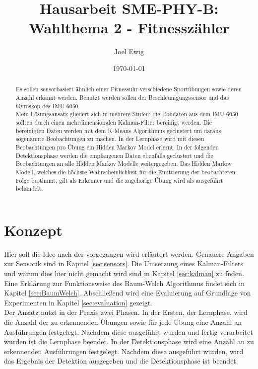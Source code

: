 \documentclass{article}
\begin{document}
\title{Hausarbeit SME-PHY-B: Wahlthema 2 - Fitnesszähler}
\author{Joel Ewig}
\date{\today}
\maketitle
\clearpage

\begin{abstract}
Es sollen sensorbasiert ähnlich einer Fitnessuhr verschiedene Sportübungen sowie deren Anzahl erkannt werden.
Benutzt werden sollen der Beschleunigungssensor und das Gyroskop des IMU-6050.\\
Mein Lösungsansatz gliedert sich in mehrere Stufen:
die Rohdaten aus dem IMU-6050 sollten durch einen mehrdimensionalen Kalman-Filter bereinigt werden.
Die bereinigten Daten werden mit dem K-Means Algorithmus geclustert um daraus sogenannte \glqq{}Beobachtungen\grqq{} zu machen. %
In der Lernphase wird mit diesen Beobachtungen pro Übung ein Hidden Markov Model erlernt.
In der folgenden Detektionsphase werden die empfangenen Daten ebenfalls geclustert und die Beobachtungen an alle Hidden Markov Modelle weitergegeben.
Das Hidden Markov Modell, welches die höchste Wahrscheinlichkeit für die Emittierung der beobachteten Folge bestimmt, gilt als Erkenner und die zugehörige Übung wird als ausgeführt behandelt.
\end{abstract}
\clearpage

\tableofcontents
\clearpage

\section{Konzept}
\label{sec:concept}
Hier soll die Idee nach der vorgegangen wird erläutert werden.
Genauere Angaben zur Sensorik sind in Kapitel \ref{sec:sensors}.
Die Umsetzung eines Kalman-Filters und warum dies hier nicht gemacht wird sind in Kapitel \ref{sec:kalman} zu fnden.
Eine Erklärung zur Funktionsweise des Baum-Welch Algorithmus findet sich in Kapitel \ref{sec:BaumWelch}.
Abschließend wird eine Evaluierung auf Grundlage von Experimenten in Kapitel \ref{sec:evaluation} gezeigt.\\


Der Ansatz nutzt in der Praxis zwei Phasen.
In der Ersten, der Lernphase, wird die Anzahl der zu erkennenden Übungen sowie für jede Übung eine Anzahl an Ausführungen festgelegt.
Nachdem diese ausgeführt wurden und fertig verarbeitet wurden ist die Lernphase beendet.
In der Detektionsphase wird eine Anzahl an zu erkennenden Ausführungen festgelegt.
Nachdem diese ausgeführt wurden, wird das Ergebnis der Detektion ausgegeben und die Detektionsphase ist beendet.
\end{document}
